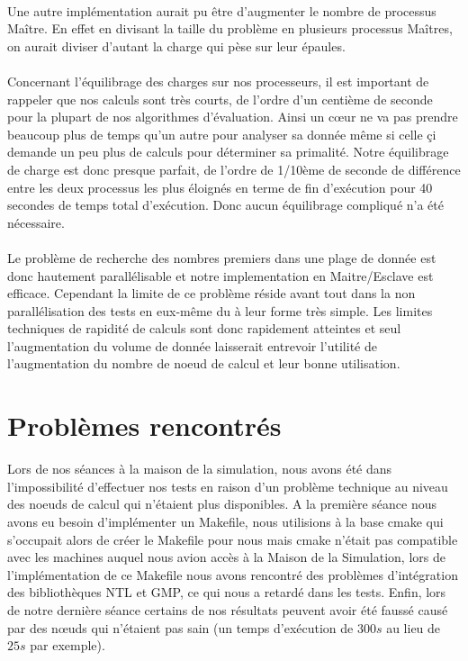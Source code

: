 \paragraph{}Une autre implémentation aurait pu être d'augmenter le nombre de processus Maître. En effet en divisant la taille du problème en plusieurs processus Maîtres, on aurait diviser d'autant la charge qui pèse sur leur épaules.

\paragraph{}Concernant l'équilibrage des charges sur nos processeurs, il est important de rappeler que nos calculs sont très courts, de l'ordre d'un centième de seconde pour la plupart de nos algorithmes d'évaluation.
Ainsi un cœur ne va pas prendre beaucoup plus de temps qu'un autre pour analyser sa donnée même si celle çi demande un peu plus de calculs pour déterminer sa primalité.
Notre équilibrage de charge est donc presque parfait, de l'ordre de 1/10ème de seconde de différence entre les deux processus les plus éloignés en terme de fin d’exécution pour 40 secondes de temps total d’exécution. Donc aucun équilibrage compliqué n'a été nécessaire.

\paragraph{}Le problème de recherche des nombres premiers dans une plage de donnée est donc hautement parallélisable et notre implementation en Maitre/Esclave est efficace. Cependant la limite de ce problème réside avant tout dans la non parallélisation des tests en eux-même du à leur forme très simple.
Les limites techniques de rapidité de calculs sont donc rapidement atteintes et seul l'augmentation du volume de donnée laisserait entrevoir l'utilité de l'augmentation du nombre de noeud de calcul et leur bonne utilisation.		
		
	\section{Problèmes rencontrés}
	Lors de nos séances à la maison de la simulation, nous avons été dans l'impossibilité d'effectuer nos tests en raison d'un problème technique au niveau des noeuds de calcul qui n'étaient plus disponibles.
	A la première séance nous avons eu besoin d'implémenter un Makefile, nous utilisions à la base cmake qui s'occupait alors de créer le Makefile pour nous mais cmake n'était pas compatible avec les machines auquel nous avion accès à la Maison de la Simulation, lors de l'implémentation de ce Makefile nous avons rencontré des problèmes d'intégration des bibliothèques NTL et GMP, ce qui nous a retardé dans les tests.
	Enfin, lors de notre dernière séance certains de nos résultats peuvent avoir été faussé causé par des nœuds qui n'étaient pas sain (un temps d'exécution de $300s$ au lieu de $25s$ par exemple).
					
